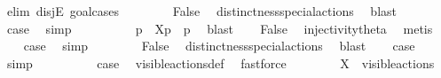 \begin{isabellebody}
\ {\isacharparenleft}{\kern0pt}elim\ disjE{\isacharcomma}{\kern0pt}\ goal{\isacharunderscore}{\kern0pt}cases{\isacharparenright}{\kern0pt}\isanewline
\ \ \isamarkupfalse%
\ {}\isanewline
\ \ \isamarkupfalse%
\ False\ \isamarkupfalse%
\ distinctness{\isacharunderscore}{\kern0pt}special{\isacharunderscore}{\kern0pt}actions\ \isamarkupfalse%
\ blast\isanewline
\ \ \isamarkupfalse%
\ {\isacharquery}{\kern0pt}case\ \isamarkupfalse%
\ simp\isanewline
{}\isamarkupfalse%
\isanewline
\ \ \isamarkupfalse%
\ {}\isanewline
\ \ \isamarkupfalse%
\ \isamarkupfalse%
\ p{\isacharprime}{\kern0pt}\ \ {\isacartoucheopen}{\isasymtheta}{\isacharbrackleft}{\kern0pt}X{\isacharbrackright}{\kern0pt}{\isacharparenleft}{\kern0pt}p{\isacharparenright}{\kern0pt}\ {\isacharequal}{\kern0pt}\ {\isasymtheta}{\isacharparenleft}{\kern0pt}p{\isacharprime}{\kern0pt}{\isacharparenright}{\kern0pt}{\isacartoucheclose}\ \isamarkupfalse%
\ blast\isanewline
\ \ \isamarkupfalse%
\ False\ \isamarkupfalse%
\ injectivity{\isacharunderscore}{\kern0pt}theta{\isacharparenleft}{\kern0pt}{}{\isacharparenright}{\kern0pt}\ \isamarkupfalse%
\ metis\isanewline
\ \ \isamarkupfalse%
\ {\isacharquery}{\kern0pt}case\ \isamarkupfalse%
\ simp\isanewline
{}\isamarkupfalse%
\isanewline
\ \ \isamarkupfalse%
\ {}\isanewline
\ \ \isamarkupfalse%
\ False\ \isamarkupfalse%
\ distinctness{\isacharunderscore}{\kern0pt}special{\isacharunderscore}{\kern0pt}actions\ \isamarkupfalse%
\ blast\isanewline
\ \ \isamarkupfalse%
\ {\isacharquery}{\kern0pt}case\ \isamarkupfalse%
\ simp\isanewline
{}\isamarkupfalse%
\isanewline
\ \ \isamarkupfalse%
\ {}\isanewline
\ \ \isamarkupfalse%
\ \isamarkupfalse%
\ {\isacharquery}{\kern0pt}case\ \isamarkupfalse%
\ visible{\isacharunderscore}{\kern0pt}actions{\isacharunderscore}{\kern0pt}def\ \isamarkupfalse%
\ fastforce\isanewline
{}\isamarkupfalse%
\isanewline
\ \ \isamarkupfalse%
\ {}\isanewline
\ \ \isamarkupfalse%
\ {\isacartoucheopen}X\ {\isasymsubseteq}\ visible{\isacharunderscore}{\kern0pt}actions{\isacartoucheclose}\ \isamarkupfalse%

\end{isabellebody}
